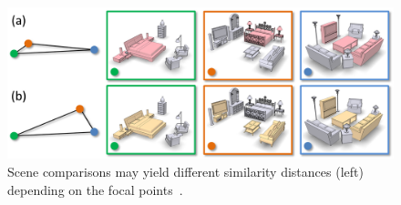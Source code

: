 
\begin{figure}[t]
\centering
    \includegraphics[width=0.99\linewidth]{fig/img/xu_sig14_focal}
    \caption{
    Scene comparisons may yield different similarity distances (left) depending on the focal points~\cite{Xu:2014:OHSC}.}
    \label{fig:xu_sig14_focal}
\end{figure}
